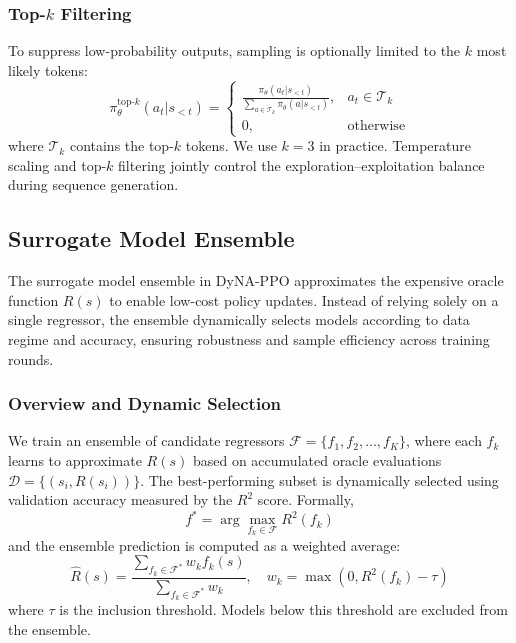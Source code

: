 \documentclass[conference]{IEEEtran}
\begin{document}
\subsubsection{Top-$k$ Filtering}

To suppress low-probability outputs, sampling is optionally limited to the $k$ most likely tokens:
\[
\pi_\theta^{\text{top-}k}(a_t|s_{<t}) = 
\begin{cases}
\frac{\pi_\theta(a_t|s_{<t})}{\sum_{a\in \mathcal{T}_k}\pi_\theta(a|s_{<t})}, & a_t\in\mathcal{T}_k\\
0, & \text{otherwise}
\end{cases}
\]
where $\mathcal{T}_k$ contains the top-$k$ tokens. We use $k=3$ in practice.  
Temperature scaling and top-$k$ filtering jointly control the exploration–exploitation balance during sequence generation.







\subsection{Surrogate Model Ensemble}

The surrogate model ensemble in DyNA-PPO approximates the expensive oracle function $R(s)$ to enable low-cost policy updates. Instead of relying solely on a single regressor, the ensemble dynamically selects models according to data regime and accuracy, ensuring robustness and sample efficiency across training rounds.

\subsubsection{Overview and Dynamic Selection}

We train an ensemble of candidate regressors $\mathcal{F} = \{f_1, f_2, \ldots, f_K\}$, where each $f_k$ learns to approximate $R(s)$ based on accumulated oracle evaluations $\mathcal{D} = \{(s_i, R(s_i))\}$. The best-performing subset is dynamically selected using validation accuracy measured by the $R^2$ score. Formally,
\begin{equation}
f^* = \arg\max_{f_k \in \mathcal{F}} R^2(f_k)
\end{equation}
and the ensemble prediction is computed as a weighted average:
\begin{equation}
\hat{R}(s) = \frac{\sum_{f_k \in \mathcal{F}^*} w_k f_k(s)}{\sum_{f_k \in \mathcal{F}^*} w_k}, \quad 
w_k = \max(0, R^2(f_k) - \tau)
\end{equation}
where $\tau$ is the inclusion threshold. Models below this threshold are excluded from the ensemble.
\end{document}
